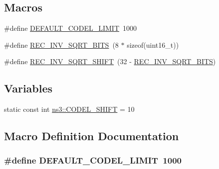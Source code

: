 \subsection*{Macros}
\begin{DoxyCompactItemize}
\item 
\#define \hyperlink{codel-queue-disc_8h_abf0559f532fb7922a8d83feaccdfcfa6}{D\+E\+F\+A\+U\+L\+T\+\_\+\+C\+O\+D\+E\+L\+\_\+\+L\+I\+M\+IT}~1000
\item 
\#define \hyperlink{codel-queue-disc_8h_a594de71aa3f8f20c5d7da6b21a16018f}{R\+E\+C\+\_\+\+I\+N\+V\+\_\+\+S\+Q\+R\+T\+\_\+\+B\+I\+TS}~(8 $\ast$ sizeof(uint16\+\_\+t))
\item 
\#define \hyperlink{codel-queue-disc_8h_afe1531f0000cbbe8e10e4905c0e5dfa0}{R\+E\+C\+\_\+\+I\+N\+V\+\_\+\+S\+Q\+R\+T\+\_\+\+S\+H\+I\+FT}~(32 -\/ \hyperlink{codel-queue-disc_8h_a594de71aa3f8f20c5d7da6b21a16018f}{R\+E\+C\+\_\+\+I\+N\+V\+\_\+\+S\+Q\+R\+T\+\_\+\+B\+I\+TS})
\end{DoxyCompactItemize}
\subsection*{Variables}
\begin{DoxyCompactItemize}
\item 
static const int \hyperlink{namespacens3_a4f884e4e2a96e50f41d5f60ea650f28e}{ns3\+::\+C\+O\+D\+E\+L\+\_\+\+S\+H\+I\+FT} = 10
\end{DoxyCompactItemize}


\subsection{Macro Definition Documentation}
\subsubsection[{\texorpdfstring{D\+E\+F\+A\+U\+L\+T\+\_\+\+C\+O\+D\+E\+L\+\_\+\+L\+I\+M\+IT}{DEFAULT_CODEL_LIMIT}}]{\setlength{\rightskip}{0pt plus 5cm}\#define D\+E\+F\+A\+U\+L\+T\+\_\+\+C\+O\+D\+E\+L\+\_\+\+L\+I\+M\+IT~1000}\hypertarget{codel-queue-disc_8h_abf0559f532fb7922a8d83feaccdfcfa6}{}\label{codel-queue-disc_8h_abf0559f532fb7922a8d83feaccdfcfa6}
